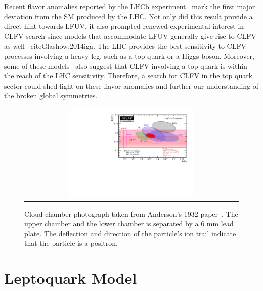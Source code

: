 Recent flavor anomalies reported by the \ac{LHCb} experiment~\cite{LHCb:2023zxo} mark the first major deviation from the SM produced by the \ac{LHC}. Not only did this result provide a direct hint towards \ac{LFUV}, it also prompted renewed experimental interest in \ac{CLFV} search since models that accommodate \ac{LFUV} generally give rise to \ac{CLFV} as well ~cite{Glashow:2014iga}. The \ac{LHC} provides the best sensitivity to \ac{CLFV} processes involving a heavy leg, such as a top quark or a Higgs boson. Moreover, some of these models~\cite{Kim:2018oih} also suggest that \ac{CLFV} involving a top quark is within the reach of the \ac{LHC} sensitivity. Therefore, a search for \ac{CLFV} in the top quark sector could shed light on these flavor anomalies and further our understanding of the broken global symmetries.

\begin{figure}[tbh!]
 \begin{center}
 \begin{tabular}{c}
 \includegraphics[width=0.6\textwidth]{figures/Part1/BSM/RD}
 \end{tabular}
 \caption{Cloud chamber photograph taken from Anderson's 1932 paper~\cite{HFLAV}. The upper chamber and the lower chamber is separated by a 6 mm lead plate. The deflection and direction of the particle's ion trail indicate that the particle is a positron.}
 \label{fig:Positron}
 \end{center}
\end{figure}

\section{Leptoquark Model}
\label{sec:Leptoquark}

\cite{Pati:1973uk}